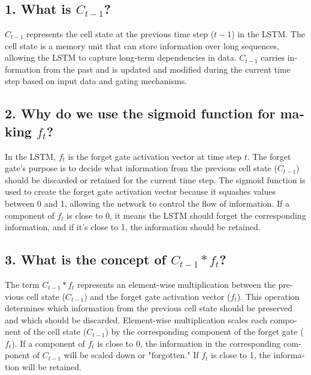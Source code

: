 \documentclass{article}
\begin{document}
\section{}
\begin{latin}
\subsection*{1. What is \(C_{t-1}\)?}
\(C_{t-1}\) represents the cell state at the previous time step (\(t-1\)) in the LSTM. The cell state is a memory unit that can store information over long sequences, allowing the LSTM to capture long-term dependencies in data. \(C_{t-1}\) carries information from the past and is updated and modified during the current time step based on input data and gating mechanisms.

\subsection*{2. Why do we use the sigmoid function for making \(f_t\)?}
In the LSTM, \(f_t\) is the forget gate activation vector at time step \(t\). The forget gate's purpose is to decide what information from the previous cell state (\(C_{t-1}\)) should be discarded or retained for the current time step. The sigmoid function is used to create the forget gate activation vector because it squashes values between 0 and 1, allowing the network to control the flow of information. If a component of \(f_t\) is close to 0, it means the LSTM should forget the corresponding information, and if it's close to 1, the information should be retained.

\subsection*{3. What is the concept of \(C_{t-1} * f_t\)?}
The term \(C_{t-1} * f_t\) represents an element-wise multiplication between the previous cell state (\(C_{t-1}\)) and the forget gate activation vector (\(f_t\)). This operation determines which information from the previous cell state should be preserved and which should be discarded. Element-wise multiplication scales each component of the cell state (\(C_{t-1}\)) by the corresponding component of the forget gate (\(f_t\)). If a component of \(f_t\) is close to 0, the information in the corresponding component of \(C_{t-1}\) will be scaled down or "forgotten." If \(f_t\) is close to 1, the information will be retained.

\end{latin}
\end{document}
